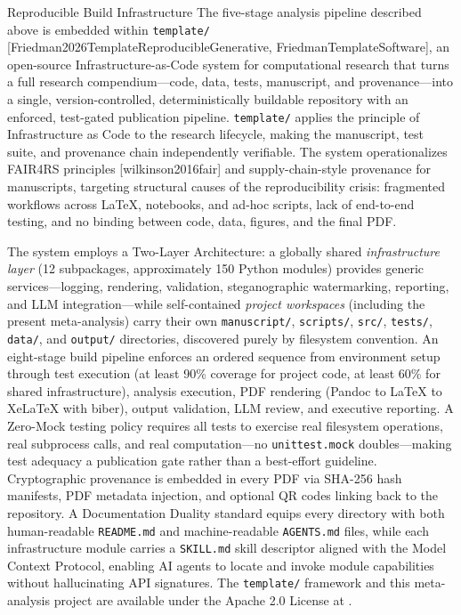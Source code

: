 \documentclass[
  ignorenonframetext,
]{beamer}
\providecommand{\citep}[1]{[#1]}
\begin{document}
\begin{frame}{Reproducible Build
Infrastructure}
\protect{}\label{reproducible-build-infrastructure}
The five-stage analysis pipeline described above is embedded within
\texttt{template/}
\citep{Friedman2026TemplateReproducibleGenerative, FriedmanTemplateSoftware},
an open-source Infrastructure-as-Code system for computational research
that turns a full research compendium---code, data, tests, manuscript,
and provenance---into a single, version-controlled, deterministically
buildable repository with an enforced, test-gated publication pipeline.
\texttt{template/} applies the principle of Infrastructure as Code to
the research lifecycle, making the manuscript, test suite, and
provenance chain independently verifiable. The system operationalizes
FAIR4RS principles \citep{wilkinson2016fair} and supply-chain-style
provenance for manuscripts, targeting structural causes of the
reproducibility crisis: fragmented workflows across LaTeX, notebooks,
and ad-hoc scripts, lack of end-to-end testing, and no binding between
code, data, figures, and the final PDF.

The system employs a Two-Layer Architecture: a globally shared
\emph{infrastructure layer} (12 subpackages, approximately 150 Python
modules) provides generic services---logging, rendering, validation,
steganographic watermarking, reporting, and LLM integration---while
self-contained \emph{project workspaces} (including the present
meta-analysis) carry their own \texttt{manuscript/}, \texttt{scripts/},
\texttt{src/}, \texttt{tests/}, \texttt{data/}, and \texttt{output/}
directories, discovered purely by filesystem convention. An eight-stage
build pipeline enforces an ordered sequence from environment setup
through test execution (at least 90\% coverage for project code, at
least 60\% for shared infrastructure), analysis execution, PDF rendering
(Pandoc to LaTeX to XeLaTeX with biber), output validation, LLM review,
and executive reporting. A Zero-Mock testing policy requires all tests
to exercise real filesystem operations, real subprocess calls, and real
computation---no \texttt{unittest.mock} doubles---making test adequacy a
publication gate rather than a best-effort guideline. Cryptographic
provenance is embedded in every PDF via SHA-256 hash manifests, PDF
metadata injection, and optional QR codes linking back to the
repository. A Documentation Duality standard equips every directory with
both human-readable \texttt{README.md} and machine-readable
\texttt{AGENTS.md} files, while each infrastructure module carries a
\texttt{SKILL.md} skill descriptor aligned with the Model Context
Protocol, enabling AI agents to locate and invoke module capabilities
without hallucinating API signatures. The \texttt{template/} framework
and this meta-analysis project are available under the Apache 2.0
License at
.
\end{frame}
\end{document}
